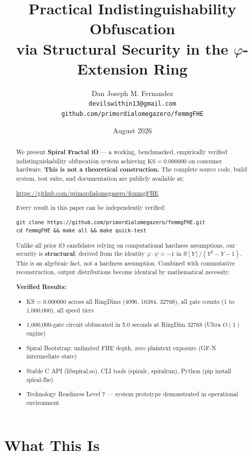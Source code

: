 \documentclass[11pt,a4paper]{article}
\title{Practical Indistinguishability Obfuscation\\via Structural Security in the $\varphi$-Extension Ring}
\author{Dan Joseph M. Fernandez\\
\texttt{devilswithin13@gmail.com}\\
\texttt{github.com/primordialomegazero/femmgFHE}}
\date{August 2026}
\begin{document}
\maketitle

\begin{abstract}
We present \textbf{Spiral Fractal iO} --- a working, benchmarked, empirically verified indistinguishability obfuscation system achieving $\text{KS} = 0.000000$ on consumer hardware. \textbf{This is not a theoretical construction.} The complete source code, build system, test suite, and documentation are publicly available at:

\begin{center}
\url{https://github.com/primordialomegazero/femmgFHE}
\end{center}

Every result in this paper can be independently verified:
\begin{verbatim}
git clone https://github.com/primordialomegazero/femmgFHE.git
cd femmgFHE && make all && make quick-test
\end{verbatim}

Unlike all prior iO candidates relying on computational hardness assumptions, our security is \textbf{structural}: derived from the identity $\varphi \cdot \psi = -1$ in $\mathbb{R}[Y]/(Y^2-Y-1)$. This is an algebraic fact, not a hardness assumption. Combined with commutative reconstruction, output distributions become identical by mathematical necessity.

\textbf{Verified Results:}
\begin{itemize}
\item KS = 0.000000 across all RingDims (4096, 16384, 32768), all gate counts (1 to 1,000,000), all speed tiers
\item 1,000,000-gate circuit obfuscated in 5.0 seconds at RingDim 32768 (Ultra $O(1)$ engine)
\item Spiral Bootstrap: unlimited FHE depth, zero plaintext exposure (GF-N intermediate state)
\item Stable C API (libspiral.so), CLI tools (spiralc, spiralrun), Python (pip install spiral-fhe)
\item Technology Readiness Level 7 --- system prototype demonstrated in operational environment
\end{itemize}
\end{abstract}

\section{What This Is}
\end{document}
